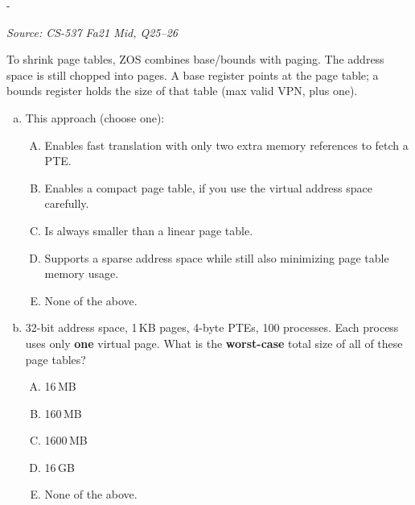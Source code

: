 \documentclass[11pt,a4paper]{article}
\makeatletter
\newcommand{\keepspace}[1]{\par\penalty-100\begingroup
  \setlength{\dimen@}{#1}\dimen@ii\pagegoal\advance\dimen@ii-\pagetotal
  \ifdim\dimen@>\dimen@ii\ifdim\dimen@ii>\z@\vfil\fi\break\fi\endgroup}
\newcounter{qn}[section]
\newenvironment{Qn}[4]{%
  \refstepcounter{qn}\keepspace{7\baselineskip}%
  \begin{tcolorbox}[qboxstyle, title={Q\thesection.\theqn\ \ [#1 \textbar\ #2]\ \ #4}]%
  {\footnotesize\color{g3}\textit{Source: #3}}\par\smallskip%
}{%
  \end{tcolorbox}%
}
\makeatother
\begin{document}
\begin{Qn}{Medium-Hard}{Lect 14}{CS-537 Fa21 Mid, Q25--26}{Base$+$bounds over a page table (segmented paging)}
To shrink page tables, ZOS combines base/bounds with paging. The address
space is still chopped into pages. A base register points at the page
table; a bounds register holds the size of that table (max valid VPN,
plus one).
\begin{enumerate}[(a)]
\item This approach (choose one):
\begin{enumerate}[(A)]
\item Enables fast translation with only two extra memory references to
      fetch a PTE.
\item Enables a compact page table, if you use the virtual address space
      carefully.
\item Is always smaller than a linear page table.
\item Supports a sparse address space while still also minimizing page
      table memory usage.
\item None of the above.
\end{enumerate}
\item 32-bit address space, 1\,KB pages, 4-byte PTEs, 100 processes.
      Each process uses only \textbf{one} virtual page. What is the
      \textbf{worst-case} total size of all of these page tables?
\begin{enumerate}[(A)]
\item 16\,MB
\item 160\,MB
\item 1600\,MB
\item 16\,GB
\item None of the above.
\end{enumerate}
\end{enumerate}
\end{Qn}
\end{document}
